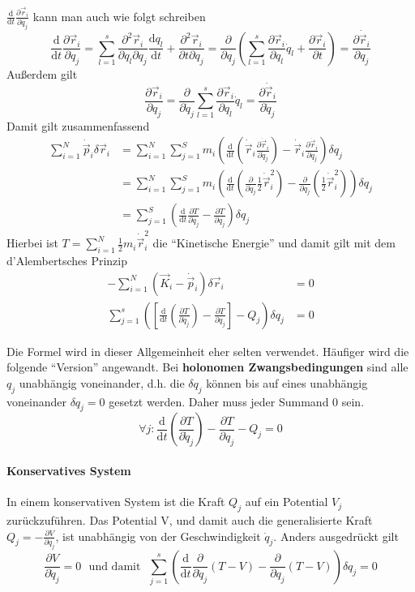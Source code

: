 \documentclass[oneside]{book}
\theoremstyle{definition}
\renewcommand{\d}{\mathrm d}
\newcommand{\dd}[1]{\frac{\d}{\d #1}}
\newcommand{\fpartial}[1]{\frac{\partial}{\partial #1}}
\newcommand{\ffpartial}[2]{\frac{\partial #1}{\partial #2}}
\newcommand{\dotvec}[1]{\dot{\vec{#1}}}
\begin{document}
$\dd t \ffpartial{\vec{r}_i}{q_j}$ kann man auch wie folgt schreiben 
$$\dd{t} \ffpartial{\vec{r}_i}{q_j} = \sum_{l=1}^s \frac{\partial^2 \vec{r}_i}{\partial q_l \partial q_j} \frac{\d q_l}{\d t} + \frac{\partial^2 \vec{r}_i}{\partial t \partial q_j} = \fpartial{q_j} \left( \sum_{l=1}^s \ffpartial{\vec{r}_i}{q_l} \dot{q}_l + \ffpartial{\vec{r}_i}{t}\right) = \ffpartial{\dot{\vec{r}}_i}{q_j}$$
Außerdem gilt
$$\ffpartial{\vec{r}_i}{q_j} = \fpartial{\dot q_j} \sum_{l = 1}^s \ffpartial{\vec{r}_i}{q_l} \dot{q}_l = \ffpartial{\dot{\vec{r}}_i}{\dot{q}_j}$$
Damit gilt zusammenfassend
\begin{align*}
\sum_{i = 1}^N \dot{\vec{p}}_i \delta \vec{r}_i &= \sum_{i=1}^N \sum_{j = 1}^S m_i \left( \dd{t} (\dotvec{r}_i  \ffpartial{\dot{\vec{r}}_i}{\dot{q}_j})  -\dot{\vec{r}}_i \ffpartial{\dotvec r_i}{q_j} \right) \delta q_j\\ 
&= \sum_{i=1}^N\sum_{j=1}^S m_i \left(  \dd{t} (\fpartial{\dot q_j} \frac12 \dotvec{r}_i^2) -\fpartial{q_j} (\frac12 \dot{\vec{r}}_i^2) \right) \delta q_j \\
&= \sum_{j = 1}^S \left( \dd{t} \ffpartial{T}{\dot{q}_j} - \ffpartial{T}{q_j} \right) \delta q_j
\end{align*}
Hierbei ist $T = \sum_{i = 1}^{N} \frac12 m_i \dot{\vec{r}}_i^2$ die "`Kinetische Energie"'
und damit gilt mit dem d'Alembertsches Prinzip
\begin{align*}
- \sum_{i = 1}^{N} (\vec{K}_i - \dot{\vec{p}}_i) \delta \vec{r}_i &= 0\\
\sum_{j = 1}^s( [\dd{t} ( \ffpartial{T}{\dot{q}_j}) - \ffpartial{T}{q_j}] - Q_j ) \delta q_j &= 0
\end{align*}

Die Formel wird in dieser Allgemeinheit eher selten verwendet. Häufiger wird die folgende "`Version"' angewandt. Bei \textbf{holonomen Zwangsbedingungen} sind alle $q_j$ unabhängig voneinander, d.h. die $\delta q_j$  können bis auf eines unabhängig voneinander $\delta q_j = 0$ gesetzt werden. Daher muss jeder Summand 0 sein.
$$\forall j:  \dd t ( \ffpartial{T}{\dot{q}_j}) - \ffpartial{T}{q_j} - Q_j = 0$$

\paragraph{Konservatives System}
In einem konservativen System ist die Kraft $Q_j$ auf ein Potential $V_j$ zurückzuführen. Das Potential V, und damit auch die generalisierte Kraft $Q_j = - \ffpartial{V}{q_j}$, ist unabhängig von der Geschwindigkeit $\dot{q}_j$. Anders ausgedrückt gilt
$$\ffpartial{V}{\dot q_j} = 0 \text{~ und damit ~} \sum_{j=1}^s \left(  \dd{t} \fpartial{\dot{q}_j} (T-V) - \fpartial{q_j} (T -V) \right) \delta q_j = 0$$
\end{document}
